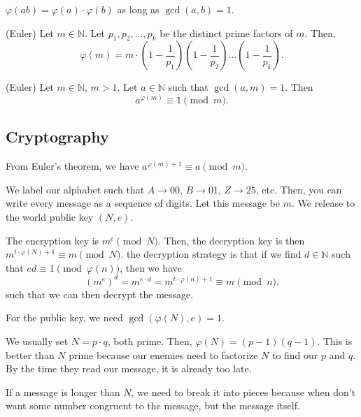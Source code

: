 \begin{theorem}
	\( \varphi(ab)=\varphi(a) \cdot  \varphi(b) \) as long as \( \gcd(a,b)=1 \).
\end{theorem}

\begin{theorem}
	(Euler) Let \( m \in \mathbb{N} \). Let \( p_{1},p_{2},\ldots ,p_k \) be the distinct prime factors of \( m \). Then, \[
		\varphi(m) = m \cdot \left( 1-\frac{1}{p_{1}} \right) \left( 1- \frac{1}{p_{2}} \right)\ldots  \left( 1-\frac{1}{p_k} \right) 
	.\] 
\end{theorem}

\begin{theorem}
	(Euler) Let \( m \in \mathbb{N} \), \( m > 1 \). Let \( a \in \mathbb{N} \) such that \( \gcd(a,m)=1 \). Then \[
		a^{\varphi(m)} \equiv 1 \pmod m
	.\] 
\end{theorem}

\subsection{Cryptography}

From Euler's theorem, we have \( a^{\varphi(m)+1}\equiv a \pmod m  \).

We label our alphabet such that \( A \to 00 \), \( B \to 01 \), \( Z \to  25 \), etc. Then, you can write every message as a sequence of digits. Let this message be \( m \). We release to the world public key \( (N,e) \).

The encryption key is \( m^e \pmod N \). Then, the decryption key is then \( m^{t\cdot \varphi(N)+1}\equiv m \pmod N  \). the decryption strategy is that if we find \( d \in \mathbb{N} \) such that \( ed \equiv 1 \pmod {\varphi(n)} \), then we have \[
	\left( m^e \right) ^d = m^{e\cdot d} = m^{t\cdot \varphi(n)+1} \equiv m \pmod n
.\] such that we can then decrypt the message.

\begin{note}
	For the public key, we need \( \gcd(\varphi(N), e)=1 \).
\end{note}

\begin{remark}
	We usually set \( N=p\cdot q \), both prime. Then, \( \varphi(N) = (p-1)(q-1) \). This is better than \( N \) prime because our enemies need to factorize \( N \) to find our \( p \) and \( q \). By the time they read our message, it is already too late.
\end{remark}

\begin{note}
	If a message is longer than \( N \), we need to break it into pieces because when don't want some number congruent to the message, but the message itself.
\end{note}
